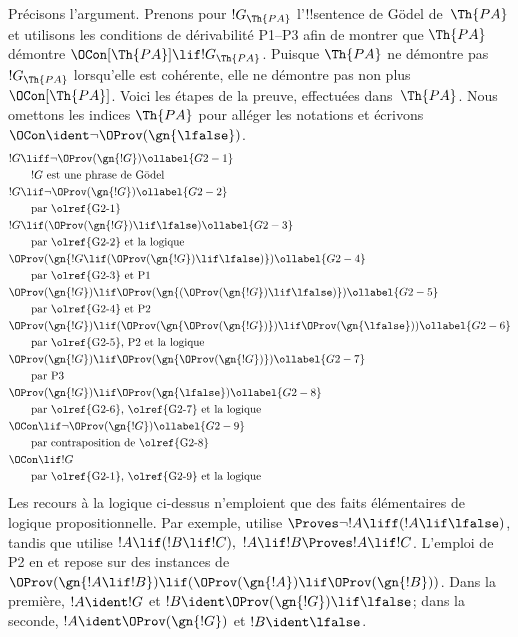 \documentclass[../../../include/open-logic-section]{subfiles}
\begin{document}
Précisons l'argument. Prenons pour $!G_\Th{PA}$
l'!!{sentence} de Gödel de~$\Th{PA}$ et utilisons
les conditions de dérivabilité P1--P3 afin de
montrer que $\Th{PA}$ démontre
$\OCon[\Th{PA}]\lif !G_\Th{PA}$. Puisque
$\Th{PA}$ ne démontre pas $!G_\Th{PA}$ lorsqu'elle
est cohérente, elle ne démontre pas non plus
$\OCon[\Th{PA}]$. Voici les étapes de la preuve,
effectuées dans~$\Th{PA}$. Nous omettons les indices
$\Th{PA}$ pour alléger les notations et écrivons
$\OCon\ident\lnot\OProv(\gn{\lfalse})$.
\begin{align}
& !G \liff \lnot \OProv(\gn{!G}) \ollabel{G2-1}\\
& \qquad\text{$!G$ est une phrase de Gödel}\notag \\
& !G \lif \lnot \OProv(\gn{!G}) \ollabel{G2-2}\\
& \qquad\text{par \olref{G2-1}} \notag\\
& !G \lif
  (\OProv(\gn{!G}) \lif \lfalse) \ollabel{G2-3}\\
& \qquad\text{par \olref{G2-2} et la logique}\notag\\
& \OProv(\gn{
    !G \lif
    (\OProv(\gn{!G}) \lif \lfalse)
  }) \ollabel{G2-4}\\
& \qquad\text{par \olref{G2-3} et P1} \notag\\
& \OProv(\gn{!G}) \lif
  \OProv(\gn{
    (\OProv(\gn{!G}) \lif \lfalse)
    }) \ollabel{G2-5}\\
& \qquad\text{par \olref{G2-4} et P2} \notag\\
& \OProv(\gn{!G}) \lif (\OProv(\gn{\OProv(\gn{!G})}) \lif \OProv(\gn{\lfalse})) \ollabel{G2-6}\\
& \qquad\text{par \olref{G2-5}, P2 et la logique} \notag\\
& \OProv(\gn{!G}) \lif
  \OProv(\gn{\OProv(\gn{!G})}) \ollabel{G2-7}\\
& \qquad\text{par P3} \notag\\
& \OProv(\gn{!G}) \lif \OProv(\gn{\lfalse}) \ollabel{G2-8}\\
& \qquad\text{par \olref{G2-6}, \olref{G2-7} et la logique}\notag\\
& \OCon \lif \lnot \OProv(\gn{!G}) \ollabel{G2-9}\\
& \qquad\text{par contraposition de \olref{G2-8}}\notag \\
& \OCon \lif !G \notag\\
& \qquad\text{par \olref{G2-1}, \olref{G2-9} et la logique}\notag
\end{align}
Les recours à la logique ci-dessus n'emploient que
des faits élémentaires de logique propositionnelle.
Par exemple,  utilise
$\Proves\lnot !A\liff(!A\lif\lfalse)$, tandis
que  utilise
$!A\lif(!B\lif !C),\ !A\lif !B\Proves !A\lif !C$.
L'emploi de P2 en  et 
repose sur des instances de
$\OProv(\gn{!A\lif !B})\lif
(\OProv(\gn{!A})\lif\OProv(\gn{!B}))$.
Dans la première, $!A\ident !G$ et
$!B\ident\OProv(\gn{!G})\lif\lfalse$;
dans la seconde, $!A\ident\OProv(\gn{!G})$
et $!B\ident\lfalse$.
\end{document}
